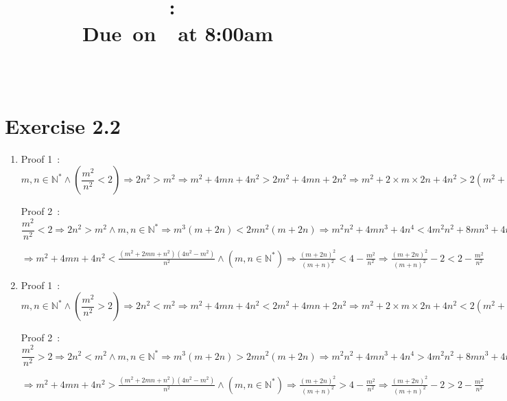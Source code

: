 \documentclass{article}
\title{
    \vspace{2in}
    \textmd{\textbf{\hmwkClass:\ \hmwkTitle}}\\
    \normalsize\vspace{0.1in}\small{Due\ on\ \hmwkDueDate\ at 8:00am}\\
    \vspace{0.1in}\large{\textit{\hmwkClassInstructor\ \hmwkClassTime}}
    \vspace{3in}
}
\author{\textbf{\hmwkAuthorName}}
\date{}
\begin{document}
\maketitle

\pagebreak



\section{Exercise 2.2}
\begin{enumerate}
    \item Proof 1\ :  $ m,n\in \mathbb{N}^*  \wedge (\dfrac{m^2}{n^2}<2)\Rightarrow
     2n^2>m^2 \Rightarrow 
     m^2+4mn+4n^2>2m^2+4mn+2n^2 \Rightarrow 
     m^2+2\times m\times 2n+4n^2>2(m^2+2mn+n^2) \Rightarrow
      (m+2n)^2 >2(m+n)^2 \Rightarrow 
      \dfrac{(m+2n)^2}{(m+n)^2}>2 $
    
    Proof 2\ : $ \dfrac{m^2}{n^2}<2\Rightarrow   
    2n^2>m^2 \wedge m,n\in \mathbb{N}^*	\Rightarrow	
    m^3(m+2n)<2mn^2(m+2n)	\Rightarrow
    m^2n^2+4mn^3+4n^4<4m^2n^2+8mn^3+4n^4-m^4-2m^3n-m^2n^2	\wedge (n\neq 0) $ 
    
    $ \Rightarrow   m^2+4mn+4n^2<\frac{\left(m^2+2 m n+n^2\right) \left(4 n^2-m^2\right)}{n^2} \wedge (m,n\in \mathbb{N}^* )	\Rightarrow	
    \frac{(m+2 n)^2}{(m+n)^2}<4-\frac{m^2}{n^2} \Rightarrow
    \frac{(m+2 n)^2}{(m+n)^2}-2<2-\frac{m^2}{n^2}
    							$
    							
    \item Proof 1\ :  $ m,n\in \mathbb{N}^*  \wedge (\dfrac{m^2}{n^2}>2)\Rightarrow
    2n^2<m^2 \Rightarrow 
    m^2+4mn+4n^2<2m^2+4mn+2n^2 \Rightarrow 
    m^2+2\times m\times 2n+4n^2<2(m^2+2mn+n^2) \Rightarrow
    (m+2n)^2 <2(m+n)^2 \Rightarrow 
    \dfrac{(m+2n)^2}{(m+n)^2}<2 $
    
    Proof 2\ : $ \dfrac{m^2}{n^2}>2\Rightarrow   
    2n^2<m^2 \wedge m,n\in \mathbb{N}^*	\Rightarrow	
    m^3(m+2n)>2mn^2(m+2n)	\Rightarrow
    m^2n^2+4mn^3+4n^4>4m^2n^2+8mn^3+4n^4-m^4-2m^3n-m^2n^2	\wedge (n\neq 0) $ 
    
    $\Rightarrow    m^2+4mn+4n^2>\frac{\left(m^2+2 m n+n^2\right) \left(4 n^2-m^2\right)}{n^2} \wedge (m,n\in \mathbb{N}^* )	\Rightarrow	
    \frac{(m+2 n)^2}{(m+n)^2}>4-\frac{m^2}{n^2} \Rightarrow
    \frac{(m+2 n)^2}{(m+n)^2}-2>2-\frac{m^2}{n^2}
    $				
    

\end{enumerate}
\end{document}
